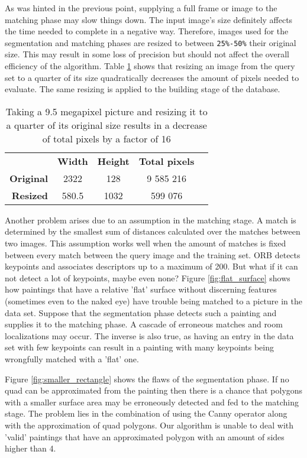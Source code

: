 As was hinted in the previous point, supplying a full frame or image to the matching phase may slow things down. The input image's size definitely affects the time needed to complete in a negative way. Therefore, images used for the segmentation and matching phases are resized to between \verb|25%-50%| their original size. This may result in some loss of precision but should not affect the overall efficiency of the algorithm. Table \ref{tab:quadratic} shows that resizing an image from the query set to a quarter of its size quadratically decreases the amount of pixels needed to evaluate. The same resizing is applied to the building stage of the database.

\begin{table}[]
	\centering
	\begin{tabular}{rcccl}
		\multicolumn{1}{l}{} & \textbf{Width} & \textbf{Height} & \textbf{Total pixels} &  \\
		\textbf{Original}    & 2322           & 128            & 9 585 216             &  \\
		\textbf{Resized}     & 580.5          & 1032            & 599 076               & 
	\end{tabular}
	\caption{Taking a 9.5 megapixel picture and resizing it to a quarter of its original size results in a decrease of total pixels by a factor of 16}
	\label{tab:quadratic}
\end{table}

Another problem arises due to an assumption in the matching stage. A match is determined by the smallest sum of distances calculated over the matches between two images. This assumption works well when the amount of matches is fixed between every match between the query image and the training set. ORB detects keypoints and associates descriptors up to a maximum of 200. But what if it can not detect a lot of keypoints, maybe even none? Figure \ref{fig:flat_surface} shows how paintings that have a relative 'flat' surface without discerning features (sometimes even to the naked eye) have trouble being matched to a picture in the data set. Suppose that the segmentation phase detects such a painting and supplies it to the matching phase. A cascade of erroneous matches and room localizations may occur. The inverse is also true, as having an entry in the data set with few keypoints can result in a painting with many keypoints being wrongfully matched with a 'flat' one.


Figure \ref{fig:smaller_rectangle} shows the flaws of the segmentation phase. If no quad can be approximated from the painting then there is a chance that polygons with a smaller surface area may be erroneously detected and fed to the matching stage. The problem lies in the combination of using the Canny operator along with the approximation of quad polygons. Our algorithm is unable to deal with 'valid' paintings that have an approximated polygon with an amount of sides higher than 4.


